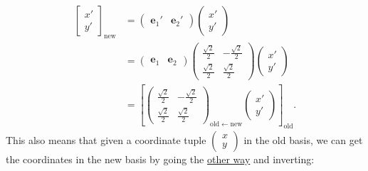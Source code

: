 \documentclass[../master.tex]{subfiles}
\begin{document}
	\begin{equation*}
		\begin{aligned}
			\begin{bmatrix}
						x' \\ y'
			\end{bmatrix}_{\mathrm{new}} 
			& = \begin{pmatrix}
				\mathbf e_1' & \mathbf e_2'
			\end{pmatrix} 
			\begin{pmatrix}
				x'\\
				y'
			\end{pmatrix}\\
			 &= \begin{pmatrix}
				\mathbf e_1 & \mathbf e_2
			\end{pmatrix} \begin{pmatrix}
					 \frac{\sqrt 2}{2} &  -\frac{\sqrt 2}{2} \\
					 \frac{\sqrt 2}{2} &  \frac{\sqrt 2}{2}
				\end{pmatrix}
			\begin{pmatrix}
				x'\\
				y'
			\end{pmatrix}\\
			& = \left[ \begin{pmatrix}
					 \frac{\sqrt 2}{2} &  -\frac{\sqrt 2}{2} \\
					 \frac{\sqrt 2}{2} &  \frac{\sqrt 2}{2}
				\end{pmatrix}_{\mathrm{old} \leftarrow \mathrm{new}}
				\begin{pmatrix}
					x'\\
					y'
				\end{pmatrix}
			 \right]_{\mathrm{old}}.
		\end{aligned}
	\end{equation*}
	This also means that given a coordinate tuple $\begin{pmatrix}x\\y\end{pmatrix}$ in the old basis, we can get the coordinates in the new basis by going the \underline{other way} and inverting:
\end{document}
